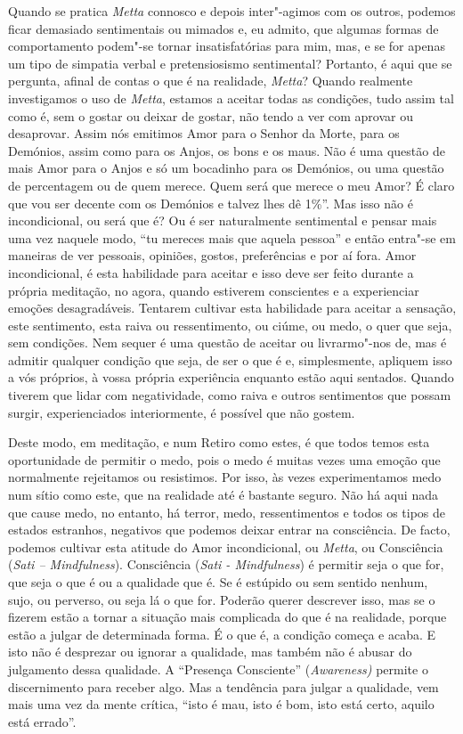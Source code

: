 Quando se pratica \emph{Metta} connosco e depois inter"-agimos com os
outros, podemos ficar demasiado sentimentais ou mimados e, eu admito,
que algumas formas de comportamento podem"-se tornar insatisfatórias para
mim, mas, e se for apenas um tipo de simpatia verbal e pretensiosismo
sentimental? Portanto, é aqui que se pergunta, afinal de contas o que é
na realidade, \emph{Metta}? Quando realmente investigamos o uso de
\emph{Metta}, estamos a aceitar todas as condições, tudo assim tal como
é, sem o gostar ou deixar de gostar, não tendo a ver com aprovar ou
desaprovar. Assim nós emitimos Amor para o Senhor da Morte, para os
Demónios, assim como para os Anjos, os bons e os maus. Não é uma questão
de mais Amor para o Anjos e só um bocadinho para os Demónios, ou uma
questão de percentagem ou de quem merece. Quem será que merece o meu
Amor? É claro que vou ser decente com os Demónios e talvez lhes dê
1\%''. Mas isso não é incondicional, ou será que é? Ou é ser
naturalmente sentimental e pensar mais uma vez naquele modo, ``tu
mereces mais que aquela pessoa'' e então entra"-se em maneiras de ver
pessoais, opiniões, gostos, preferências e por aí fora. Amor
incondicional, é esta habilidade para aceitar e isso deve ser feito
durante a própria meditação, no agora, quando estiverem conscientes e a
experienciar emoções desagradáveis. Tentarem cultivar esta habilidade
para aceitar a sensação, este sentimento, esta raiva ou ressentimento,
ou ciúme, ou medo, o quer que seja, sem condições. Nem sequer é uma
questão de aceitar ou livrarmo"-nos de, mas é admitir qualquer condição
que seja, de ser o que é e, simplesmente, apliquem isso a vós próprios,
à vossa própria experiência enquanto estão aqui sentados. Quando tiverem
que lidar com negatividade, como raiva e outros sentimentos que possam
surgir, experienciados interiormente, é possível que não gostem.

Deste modo, em meditação, e num Retiro como estes, é que todos temos
esta oportunidade de permitir o medo, pois o medo é muitas vezes uma
emoção que normalmente rejeitamos ou resistimos. Por isso, às vezes
experimentamos medo num sítio como este, que na realidade até é bastante
seguro. Não há aqui nada que cause medo, no entanto, há terror, medo,
ressentimentos e todos os tipos de estados estranhos, negativos que
podemos deixar entrar na consciência. De facto, podemos cultivar esta
atitude do Amor incondicional, ou \emph{Metta}, ou Consciência
(\emph{Sati -- Mindfulness}). Consciência (\emph{Sati - Mindfulness}) é
permitir seja o que for, que seja o que é ou a qualidade que é. Se é
estúpido ou sem sentido nenhum, sujo, ou perverso, ou seja lá o que for.
Poderão querer descrever isso, mas se o fizerem estão a tornar a
situação mais complicada do que é na realidade, porque estão a julgar de
determinada forma. É o que é, a condição começa e acaba. E isto não é
desprezar ou ignorar a qualidade, mas também não é abusar do julgamento
dessa qualidade. A ``Presença Consciente'' (\emph{Awareness)} permite o
discernimento para receber algo. Mas a tendência para julgar a
qualidade, vem mais uma vez da mente crítica, ``isto é mau, isto é bom,
isto está certo, aquilo está errado''.

